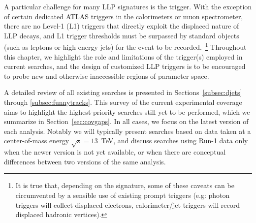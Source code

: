 A particular challenge for many LLP signatures is the trigger. With the exception of certain dedicated ATLAS triggers in the calorimeters or muon spectrometer, there are no Level-1 (L1) triggers that directly exploit the displaced nature of LLP decays, and L1 trigger thresholds must be surpassed by standard objects (such as leptons or high-energy jets) for the event to be recorded.~\footnote{It is true that, depending on the signature, some of these caveats can be circumvented by a sensible use of existing prompt triggers (e.g: photon triggers will collect displaced electrons, calorimeter/jet triggers will record displaced hadronic vertices).} Throughout this chapter, we highlight the role and limitations of the trigger(s) employed in current searches, and the design of customized LLP triggers is to be encouraged to probe new and otherwise inaccessible regions of parameter space.

A detailed review of all existing searches is presented in Sections~\ref{subsec:djets} through \ref{subsec:funnytracks}. This survey of the current experimental coverage aims to highlight the highest-priority searches still yet to be performed, which we summarize in Section~\ref{sec:covgaps}. In all cases, we focus on the latest version of each analysis. Notably we will typically present searches based on data taken at a center-of-mass energy $\sqrt{s}=13$~TeV, and discuss searches using Run-1 data only when the newer version is not yet available, or when there are conceptual differences between two versions of the same analysis.



